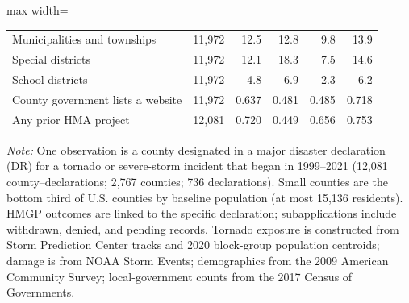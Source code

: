 \begin{table}[!htbp]
\begin{adjustbox}{max width=\linewidth}
\begin{tabular}{@{}lrrrrr@{}}
\quad Municipalities and townships & 11,972 & 12.5 & 12.8 & 9.8 & 13.9 \\
\quad Special districts & 11,972 & 12.1 & 18.3 & 7.5 & 14.6 \\
\quad School districts & 11,972 & 4.8 & 6.9 & 2.3 & 6.2 \\
\quad County government lists a website & 11,972 & 0.637 & 0.481 & 0.485 & 0.718 \\
\quad Any prior HMA project & 12,081 & 0.720 & 0.449 & 0.656 & 0.753 \\
\bottomrule
\end{tabular}
\end{adjustbox}
\begin{minipage}{0.95\linewidth}\vspace{4pt}\scriptsize
\textit{Note:} One observation is a county designated in a major disaster declaration (DR) for a tornado or severe-storm incident that began in 1999--2021 (12,081 county--declarations; 2,767 counties; 736 declarations). Small counties are the bottom third of U.S. counties by baseline population (at most 15,136 residents). HMGP outcomes are linked to the specific declaration; subapplications include withdrawn, denied, and pending records. Tornado exposure is constructed from Storm Prediction Center tracks and 2020 block-group population centroids; damage is from NOAA Storm Events; demographics from the 2009 American Community Survey; local-government counts from the 2017 Census of Governments.
\end{minipage}
\end{table}
